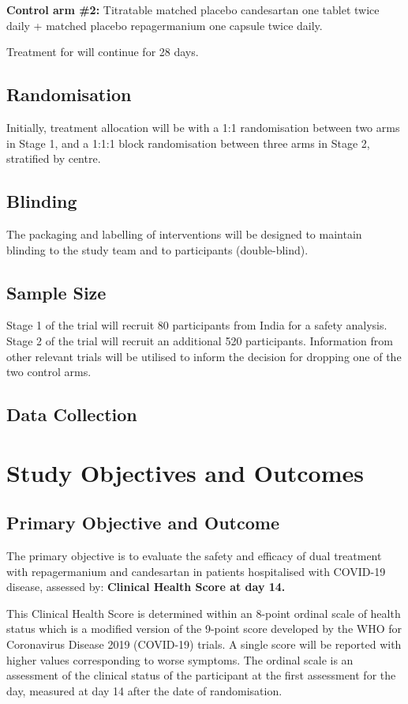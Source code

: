 \documentclass[11pt,parskip=full-]{scrartcl}
\begin{document}
\textbf{Control arm \#2:}  Titratable matched placebo candesartan
one tablet twice daily + matched placebo repagermanium one capsule twice daily.

Treatment for will continue for 28 days.

\subsection{Randomisation}
Initially, treatment allocation will be with a 1:1 randomisation between two arms in Stage 1, and a 1:1:1 block randomisation between three arms in Stage 2, stratified by centre.

\subsection{Blinding}
The packaging and labelling of interventions will be designed to maintain blinding to the study team and to participants (double-blind).

\subsection{Sample Size}
Stage 1 of the trial will recruit 80 participants from India for a safety analysis. Stage 2 of the trial will recruit an additional 520 participants. Information from other relevant trials will be utilised to inform the decision for dropping one of the two control arms.

\subsection{Data Collection}

\clearpage

\section{Study Objectives and Outcomes}

\subsection{Primary Objective and Outcome}
The primary objective is to evaluate the safety and efficacy of dual treatment with repagermanium and candesartan in patients hospitalised with COVID-19 disease, assessed by: \textbf{Clinical Health Score at day 14.}

This Clinical Health Score is determined within an 8-point ordinal scale of health status which is a modified version of the 9-point score developed by the WHO for Coronavirus Disease 2019 (COVID-19) trials. A single score will be reported with higher values corresponding to worse symptoms. The ordinal scale is an assessment of the clinical status of the participant at the first assessment for the day, measured at day 14 after the date of randomisation.
\end{document}
